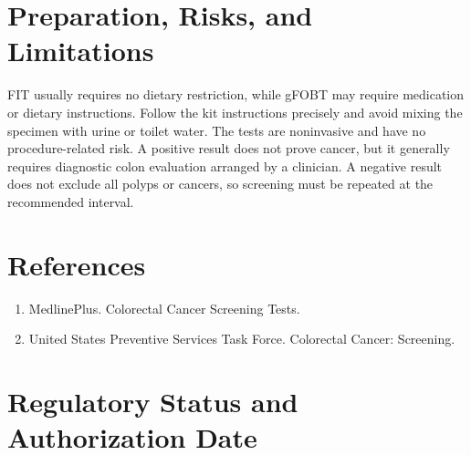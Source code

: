 \section*{Preparation, Risks, and Limitations}
FIT usually requires no dietary restriction, while gFOBT may require medication or dietary instructions. Follow the kit instructions precisely and avoid mixing the specimen with urine or toilet water. The tests are noninvasive and have no procedure-related risk. A positive result does not prove cancer, but it generally requires diagnostic colon evaluation arranged by a clinician. A negative result does not exclude all polyps or cancers, so screening must be repeated at the recommended interval.

\section*{References}
\begin{enumerate}
  \item MedlinePlus. Colorectal Cancer Screening Tests.
  \item United States Preventive Services Task Force. Colorectal Cancer: Screening.
\end{enumerate}

\clearpage


\section*{Regulatory Status and Authorization Date}

\clearpage
